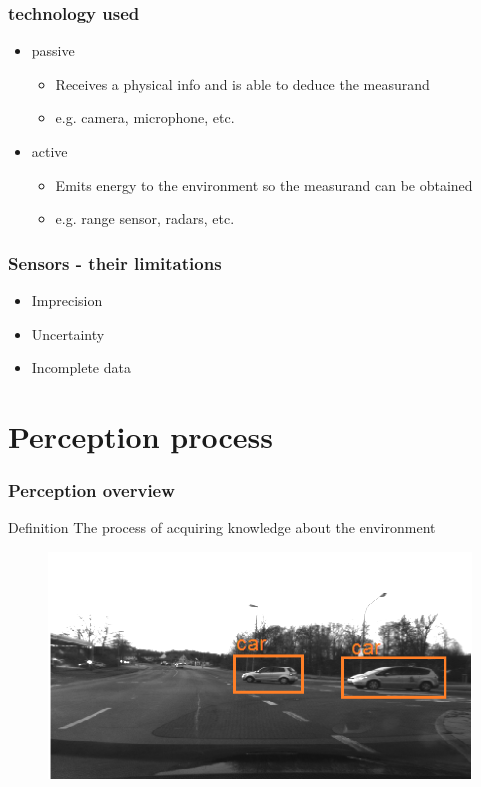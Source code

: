 \documentclass{beamer}
\begin{document}
	\begin{frame}
		\frametitle{technology used}
		\begin{itemize}
		\item passive
			\begin{itemize}
				\item Receives a physical info and is able to deduce the measurand
				\item e.g. camera, microphone, etc. 
			\end{itemize}			
		\item active
			\begin{itemize}
				\item Emits energy to the environment so the measurand can be obtained
				\item e.g. range sensor, radars, etc.
			\end{itemize}			
		\end{itemize}		
		
	\end{frame}
	
	\begin{frame}
		\frametitle{Sensors - their limitations}

		\begin{itemize}
			\item Imprecision
			\item Uncertainty
			\item Incomplete data
		\end{itemize}		
		
	\end{frame}

\section{Perception process}

	\begin{frame}
		\frametitle{Perception overview}
		\begin{block}{Definition}
			The process of acquiring knowledge about the environment \cite{iyengar1991autonomous}
		\end{block}	
		
		\begin{figure}[h]
			\center
			\includegraphics[scale=0.3]{img/fig:perception:ex1}
		\end{figure}
		 
	\end{frame}
\end{document}

